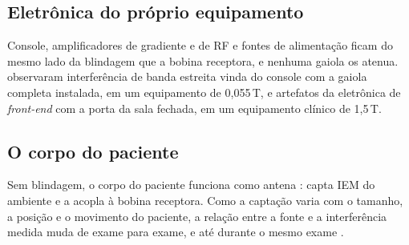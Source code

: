 \documentclass[portuguese]{sbcreviews-2025}%
\begin{document}
\subsection{Eletrônica do próprio equipamento}
\label{subsec:internas}

Console, amplificadores de gradiente e de RF e fontes de alimentação ficam do mesmo lado da blindagem que a bobina receptora, e nenhuma gaiola os atenua. \citet{zhao2024emi} observaram interferência de banda estreita vinda do console com a gaiola completa instalada, em um equipamento de 0,055\,T, e artefatos da eletrônica de \textit{front-end} com a porta da sala fechada, em um equipamento clínico de 1,5\,T.

\subsection{O corpo do paciente}

Sem blindagem, o corpo do paciente funciona como antena \citep{kibret2016analysis}: capta IEM do ambiente e a acopla à bobina receptora. Como a captação varia com o tamanho, a posição e o movimento do paciente, a relação entre a fonte e a interferência medida muda de exame para exame, e até durante o mesmo exame \citep{zhao2024emi}.
\end{document}
